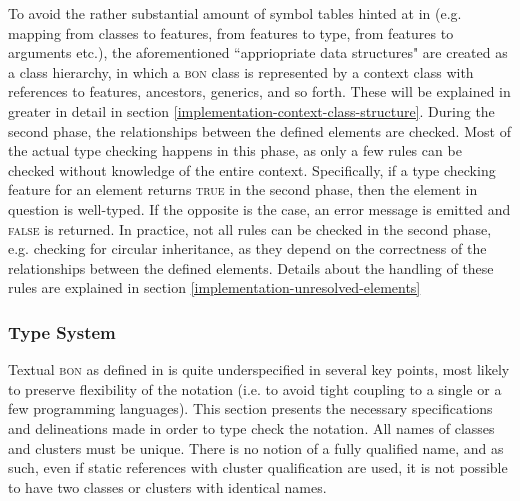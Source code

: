 To avoid the rather substantial amount of symbol tables hinted at in \cite{appel2004} (e.g. mapping from classes to features, from features to type, from features to arguments etc.), the aforementioned ``appriopriate data structures" are created as a class hierarchy, in which a \textsc{bon} class is represented by a context class with references to features, ancestors, generics, and so forth. These will be explained in greater in detail in section \ref{implementation-context-class-structure}.
During the second phase, the relationships between the defined elements are checked. Most of the actual type checking happens in this phase, as only a few rules can be checked without knowledge of the entire context. Specifically, if a type checking feature for an element returns \textsc{true} in the second phase, then the element in question is well-typed. If the opposite is the case, an error message is emitted and \textsc{false} is returned. In practice, not all rules can be checked in the second phase, e.g. checking for circular inheritance, as they depend on the correctness of the relationships between the defined elements. Details about the handling of these rules are explained in section \ref{implementation-unresolved-elements}

\subsubsection {Type System}
\label{design-type-system}
Textual \textsc{bon} as defined in \cite{walden1995} is quite underspecified in several key points, most likely to preserve flexibility of the notation (i.e. to avoid tight coupling to a single or a few programming languages). This section presents the necessary specifications and delineations made in order to type check the notation.
\label{design-type-names}
All names of classes and clusters must be unique. There is no notion of a fully qualified name, and as such, even if static references with cluster qualification are used, it is not possible to have two classes or clusters with identical names.

